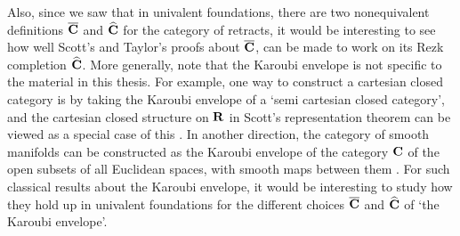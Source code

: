 Also, since we saw that in univalent foundations, there are two nonequivalent definitions $ \overline {\mathbf{C}} $ and $ \widehat {\mathbf{C}} $ for the category of retracts, it would be interesting to see how well Scott's and Taylor's proofs about $ \overline {\mathbf{C}} $, can be made to work on its Rezk completion $ \widehat {\mathbf{C}} $. More generally, note that the Karoubi envelope is not specific to the material in this thesis. For example, one way to construct a cartesian closed category is by taking the Karoubi envelope of a `semi cartesian closed category', and the cartesian closed structure on $ \mathbf{R} $ in Scott's representation theorem can be viewed as a special case of this \autocite{hayashi-1985-semifunctors}. In another direction, the category of smooth manifolds can be constructed as the Karoubi envelope of the category $ \mathbf{C} $ of the open subsets of all Euclidean spaces, with smooth maps between them \autocite[][267]{Lawvere-Karoubi}. For such classical results about the Karoubi envelope, it would be interesting to study how they hold up in univalent foundations for the different choices $ \overline {\mathbf{C}} $ and $ \widehat {\mathbf{C}} $ of `the Karoubi envelope'.
